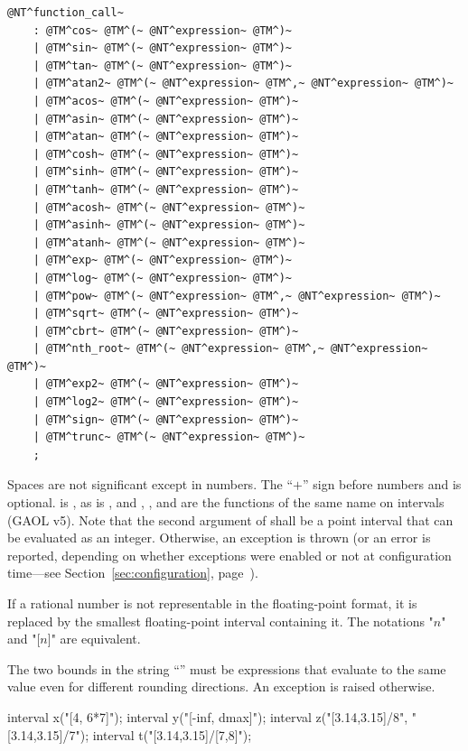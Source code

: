 \documentclass{manual}
\begin{document}
\begin{Verbatim}[commandchars=\@\^\~]
@NT^function_call~
	: @TM^cos~ @TM^(~ @NT^expression~ @TM^)~
	| @TM^sin~ @TM^(~ @NT^expression~ @TM^)~
	| @TM^tan~ @TM^(~ @NT^expression~ @TM^)~
	| @TM^atan2~ @TM^(~ @NT^expression~ @TM^,~ @NT^expression~ @TM^)~
	| @TM^acos~ @TM^(~ @NT^expression~ @TM^)~
	| @TM^asin~ @TM^(~ @NT^expression~ @TM^)~
	| @TM^atan~ @TM^(~ @NT^expression~ @TM^)~
	| @TM^cosh~ @TM^(~ @NT^expression~ @TM^)~
	| @TM^sinh~ @TM^(~ @NT^expression~ @TM^)~
	| @TM^tanh~ @TM^(~ @NT^expression~ @TM^)~
	| @TM^acosh~ @TM^(~ @NT^expression~ @TM^)~
	| @TM^asinh~ @TM^(~ @NT^expression~ @TM^)~
	| @TM^atanh~ @TM^(~ @NT^expression~ @TM^)~
	| @TM^exp~ @TM^(~ @NT^expression~ @TM^)~
	| @TM^log~ @TM^(~ @NT^expression~ @TM^)~
	| @TM^pow~ @TM^(~ @NT^expression~ @TM^,~ @NT^expression~ @TM^)~
	| @TM^sqrt~ @TM^(~ @NT^expression~ @TM^)~
	| @TM^cbrt~ @TM^(~ @NT^expression~ @TM^)~
	| @TM^nth_root~ @TM^(~ @NT^expression~ @TM^,~ @NT^expression~ @TM^)~
	| @TM^exp2~ @TM^(~ @NT^expression~ @TM^)~
	| @TM^log2~ @TM^(~ @NT^expression~ @TM^)~
	| @TM^sign~ @TM^(~ @NT^expression~ @TM^)~
	| @TM^trunc~ @TM^(~ @NT^expression~ @TM^)~
	;
\end{Verbatim}

Spaces are not significant except in numbers. The ``$+$'' sign before
numbers and  is optional.
 is , as  is
, and , ,  and
 are the functions of the same name on intervals (GAOL v5).
Note that the second argument of  shall be a point interval that can be evaluated
as an integer. Otherwise, an  exception is thrown (or an error is 
reported, depending on whether exceptions were enabled or not at configuration time---see Section~\ref{sec:configuration}, page~\pageref{sec:configuration}).

If a rational number is not representable in the floating-point format, it is
replaced by the smallest floating-point interval containing it. The notations
"$n$" and "[$n$]" are equivalent.

The two bounds in the string ``'' must be expressions that evaluate to the same value even for different rounding directions. An
 exception is raised otherwise.

\begin{example}
interval x("[4, 6*7]");
interval y("[-inf, dmax]");
interval z("[3.14,3.15]/8", "[3.14,3.15]/7");
interval t("[3.14,3.15]/[7,8]");
\end{example}
\end{document}
